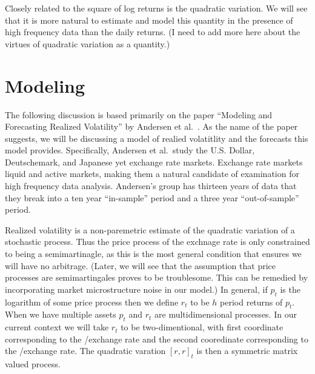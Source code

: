 \documentclass{report}
\begin{document}
Closely related to the square of log returns is the quadratic
variation.  We will see that it is more natural to estimate and model
this quantity in the presence of high frequency data than the daily
returns.  (I need to add more here about the virtues of quadratic
variation as a quantity.)

\section{Modeling}

The following discussion is based primarily on the paper ``Modeling
and Forecasting Realized Volatility'' by Andersen et al.\
\cite{Andersen03}.  As the name of the paper suggests, we will be
discussing a model of realied volatitlity and the forecasts this model
provides.  Specifically, Andersen et al.\ study the U.S. Dollar,
Deutschemark, and Japanese yet exchange rate markets.  Exchange rate
markets liquid and active markets, making them a natural candidate of
examination for high frequency data analysis.  Andersen's group has
thirteen years of data that they break into a ten year ``in-sample''
period and a three year ``out-of-sample'' period.

Realized volatility is a non-paremetric estimate of the quadratic
variation of a stochastic process.  Thus the price process of the
exchnage rate is only constrained to being a semimartinagle, as this
is the most general condition that ensures we will have no arbitrage. 
(Later, we will see that the assumption that price processes are
semimartingales proves to be troublesome.  This can be remedied by
incorporating market microstructure noise in our model.)  In general,
if $p_t$ is the logarithm of some price process then we define $r_t$
to be $h$ period returns of $p_t$.  When we have multiple assets $p_t$
and $r_t$ are multidimensional processes.  In our current context we
will take $r_t$ to be two-dimentional, with first coordinate
corresponding to the \deu/\dol exchange rate and the second
cooredinate corresponding to the \yen/\dol exchange rate.  The
quadratic varation $[r,r]_t$ is then a symmetric matrix valued
process.
\end{document}
